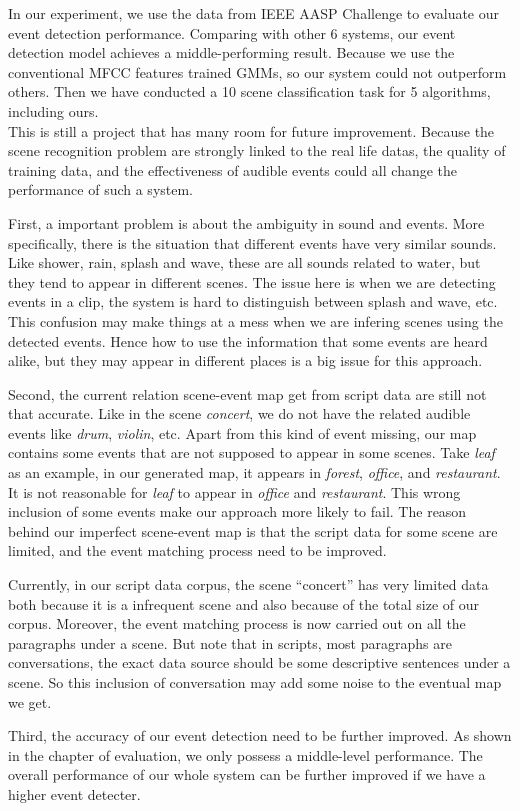 In our experiment, we use the data from IEEE AASP Challenge to evaluate our event detection performance. 
Comparing with other 6 systems, our event detection model achieves a middle-performing result. 
Because we use the conventional MFCC features trained GMMs, so our system could not outperform others. 
Then we have conducted a 10 scene classification task for 5 algorithms, including ours. \\ 

This is still a project that has many room for future improvement. 
Because the scene recognition problem are strongly linked to the real life datas, the quality of training data, and the effectiveness of audible events could all change the performance of such a system. 

First, a important problem is about the ambiguity in sound and events. 
More specifically, there is the situation that different events have very similar sounds. 
Like shower, rain, splash and wave, these are all sounds related to water, but they tend to appear in different scenes. 
The issue here is when we are detecting events in a clip, the system is hard to distinguish between splash and wave, etc. 
This confusion may make things at a mess when we are infering scenes using the detected events. 
Hence how to use the information that some events are heard alike, but they may appear in different places is a big issue for this approach. 

Second, the current relation scene-event map get from script data are still not that accurate. 
Like in the scene \textit{concert}, we do not have the related audible events like \textit{drum}, \textit{violin}, etc. 
Apart from this kind of event missing, our map contains some events that are not supposed to appear in some scenes. 
Take \textit{leaf} as an example, in our generated map, it appears in \textit{forest}, \textit{office}, and \textit{restaurant}. 
It is not reasonable for \textit{leaf} to appear in \textit{office} and \textit{restaurant}. 
This wrong inclusion of some events make our approach more likely to fail. 
The reason behind our imperfect scene-event map is that the script data for some scene are limited, and the event matching process need to be improved. 

Currently, in our script data corpus, the scene ``concert'' has very limited data both because it is a infrequent scene and also because of the total size of our corpus. 
Moreover, the event matching process is now carried out on all the paragraphs under a scene. 
But note that in scripts, most paragraphs are conversations, the exact data source should be some descriptive sentences under a scene.
So this inclusion of conversation may add some noise to the eventual map we get. 

Third, the accuracy of our event detection need to be further improved. 
As shown in the chapter of evaluation, we only possess a middle-level performance. 
The overall performance of our whole system can be further improved if we have a higher event detecter. 

